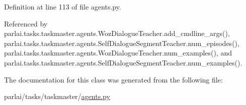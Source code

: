 Definition at line 113 of file agents.\+py.



Referenced by parlai.\+tasks.\+taskmaster.\+agents.\+Woz\+Dialogue\+Teacher.\+add\+\_\+cmdline\+\_\+args(), parlai.\+tasks.\+taskmaster.\+agents.\+Self\+Dialogue\+Segment\+Teacher.\+num\+\_\+episodes(), parlai.\+tasks.\+taskmaster.\+agents.\+Woz\+Dialogue\+Teacher.\+num\+\_\+examples(), and parlai.\+tasks.\+taskmaster.\+agents.\+Self\+Dialogue\+Segment\+Teacher.\+num\+\_\+examples().



The documentation for this class was generated from the following file\+:\begin{DoxyCompactItemize}
\item 
parlai/tasks/taskmaster/\hyperlink{parlai_2tasks_2taskmaster_2agents_8py}{agents.\+py}\end{DoxyCompactItemize}
